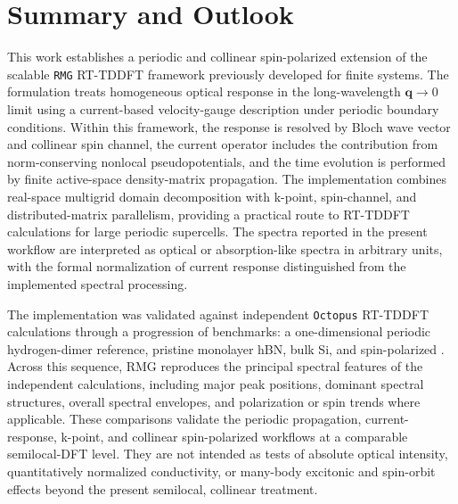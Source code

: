 \documentclass[journal=jctcce,manuscript=article,etalmode=truncate,maxauthors=10,layout=onecolumn]{achemso}
\begin{document}
\section{Summary and Outlook}
\label{sec:summary}

This work establishes a periodic and collinear spin-polarized extension
of the scalable \texttt{RMG} RT-TDDFT framework previously developed
for finite systems.\cite{jakowski-rmg-tddft-2025}  The formulation
treats homogeneous optical response in the long-wavelength
$\mathbf q\rightarrow0$ limit using a current-based velocity-gauge
description under periodic boundary conditions.  Within this framework,
the response is resolved by Bloch wave vector and collinear spin
channel, the current operator includes the contribution from
norm-conserving nonlocal pseudopotentials, and the time evolution is
performed by finite active-space density-matrix propagation.  The
implementation combines real-space multigrid domain decomposition with
k-point, spin-channel, and distributed-matrix parallelism, providing a
practical route to RT-TDDFT calculations for large periodic supercells.
The spectra reported in the present workflow are interpreted as optical
or absorption-like spectra in arbitrary units, with the formal
normalization of current response distinguished from the implemented
spectral processing.


The implementation was validated against independent \texttt{Octopus}
RT-TDDFT calculations through a progression of benchmarks:
a one-dimensional periodic hydrogen-dimer reference, pristine monolayer
hBN, bulk Si, and spin-polarized .  Across this sequence, RMG
reproduces the principal spectral features of the independent
calculations, including major peak positions, dominant spectral
structures, overall spectral envelopes, and polarization or spin trends
where applicable.  These comparisons validate the periodic propagation,
current-response, k-point, and collinear spin-polarized workflows at a
comparable semilocal-DFT level.  They are not intended as tests of
absolute optical intensity, quantitatively normalized conductivity, or
many-body excitonic and spin-orbit effects beyond the present
semilocal, collinear treatment.
\end{document}
